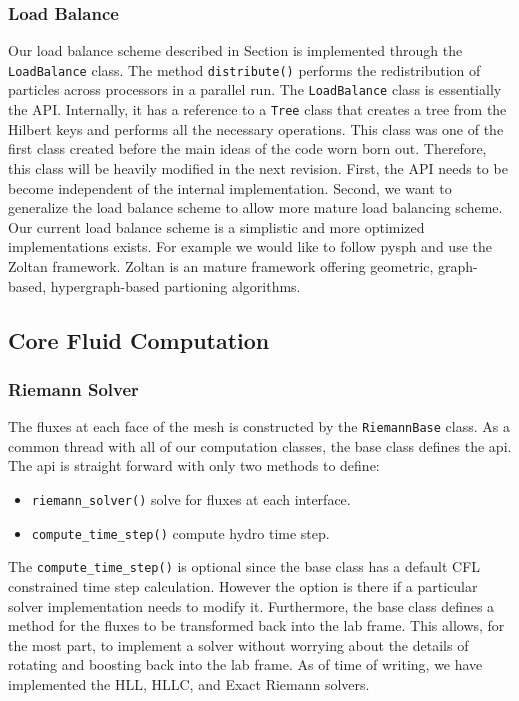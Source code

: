 \subsubsection{Load Balance}
Our load balance scheme described in Section is implemented through the \lstinline{LoadBalance}
class. The method \lstinline{distribute()} performs the redistribution of particles across processors in a 
parallel run. The \lstinline{LoadBalance} class is essentially the API. Internally, it has a reference
to a \lstinline{Tree} class that creates a tree from the Hilbert keys and performs all the necessary
operations. This class was one of the first class created before the main ideas of the code worn born
out. Therefore, this class will be heavily modified in the next revision. First, the API needs to be
become independent of the internal implementation. Second, we want to generalize the load balance
scheme to allow more mature load balancing scheme. Our current load balance scheme is a simplistic
and more optimized implementations exists. For example we would like to follow pysph and use the Zoltan 
\citep{Devine2000}framework. Zoltan is an mature framework offering geometric,
graph-based, hypergraph-based partioning algorithms.


\subsection{Core Fluid Computation}
\subsubsection{Riemann Solver}
The fluxes at each face of the mesh is constructed by the \lstinline{RiemannBase} class.
As a common thread with all of our computation classes, the base class defines the api.
The api is straight forward with only two methods to define:
\begin{itemize}
	\item \lstinline{riemann_solver()} solve for fluxes at each interface.
    \item \lstinline{compute_time_step()} compute hydro time step.
\end{itemize}
The \lstinline{compute_time_step()} is optional since the base class has a default
CFL constrained time step calculation. However the option is there if a particular 
solver implementation needs to modify it. Furthermore, the base class defines a 
method for the fluxes to be transformed back into the lab frame. This allows,
for the most part, to implement a solver without worrying about the details of
rotating and boosting back into the lab frame. As of time of writing, we have
implemented the HLL, HLLC, and Exact Riemann solvers.

